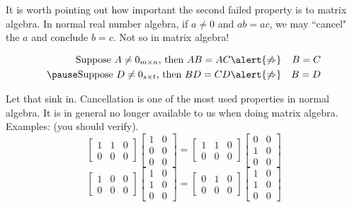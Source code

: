 \begin{frame}
It is worth pointing out how important the second failed property is to matrix algebra. 
\bpause 
In normal real number algebra, if $a\ne 0$ and $ab=ac$, we may ``cancel" the $a$ and conclude $b=c$. Not so in matrix algebra!
\pause \begin{theorem}
\begin{eqnarray*}
\text{Suppose $A\ne 0_{m\times n}$, then  } AB=AC &\alert{\not\Rightarrow}& B=C\\
\pause \text{Suppose $D\ne 0_{s\times t}$,  then } BD=CD &\alert{\not\Rightarrow}& B=D
\end{eqnarray*}
\end{theorem}
\bpause Let that sink in. Cancellation is one of the most used properties in normal algebra. It is in general no longer available to us when doing matrix algebra. 
\bpause \alert{Examples:} (you should verify). 
\[
\begin{bmatrix}
1&1&0\\
0&0&0
\end{bmatrix}\begin{bmatrix}
1&0\\
0&0\\
0&0
\end{bmatrix}
=
\begin{bmatrix}
1&1&0\\
0&0&0
\end{bmatrix}\begin{bmatrix}
0&0\\
1&0\\
0&0
\end{bmatrix}
\]
\[
\begin{bmatrix}
1&0&0\\
0&0&0
\end{bmatrix}\begin{bmatrix}
1&0\\
1&0\\
0&0
\end{bmatrix}
=
\begin{bmatrix}
0&1&0\\
0&0&0
\end{bmatrix}\begin{bmatrix}
1&0\\
1&0\\
0&0
\end{bmatrix}
\]
\end{frame}

